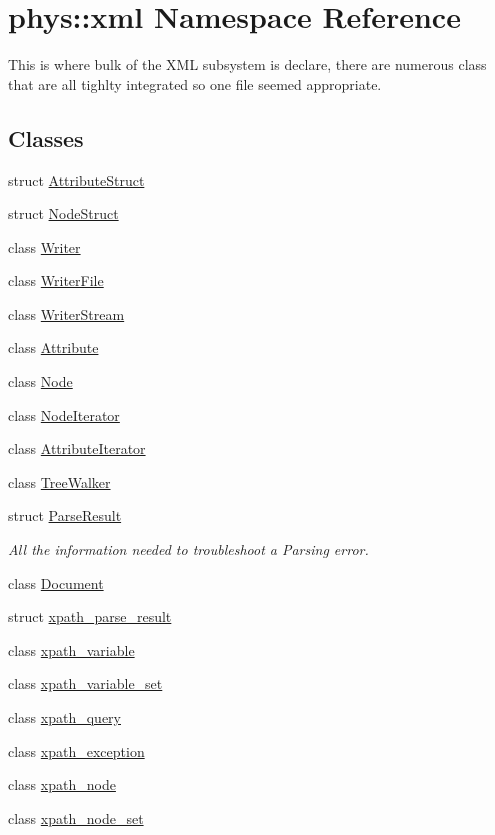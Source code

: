 \hypertarget{namespacephys_1_1xml}{
\section{phys::xml Namespace Reference}
\label{d9/d27/namespacephys_1_1xml}
}


This is where bulk of the XML subsystem is declare, there are numerous class that are all tighlty integrated so one file seemed appropriate.  


\subsection*{Classes}
\begin{DoxyCompactItemize}
\item 
struct \hyperlink{structphys_1_1xml_1_1AttributeStruct}{AttributeStruct}
\item 
struct \hyperlink{structphys_1_1xml_1_1NodeStruct}{NodeStruct}
\item 
class \hyperlink{classphys_1_1xml_1_1Writer}{Writer}
\item 
class \hyperlink{classphys_1_1xml_1_1WriterFile}{WriterFile}
\item 
class \hyperlink{classphys_1_1xml_1_1WriterStream}{WriterStream}
\item 
class \hyperlink{classphys_1_1xml_1_1Attribute}{Attribute}
\item 
class \hyperlink{classphys_1_1xml_1_1Node}{Node}
\item 
class \hyperlink{classphys_1_1xml_1_1NodeIterator}{NodeIterator}
\item 
class \hyperlink{classphys_1_1xml_1_1AttributeIterator}{AttributeIterator}
\item 
class \hyperlink{classphys_1_1xml_1_1TreeWalker}{TreeWalker}
\item 
struct \hyperlink{structphys_1_1xml_1_1ParseResult}{ParseResult}
\begin{DoxyCompactList}\small\item\em All the information needed to troubleshoot a Parsing error. \item\end{DoxyCompactList}\item 
class \hyperlink{classphys_1_1xml_1_1Document}{Document}
\item 
struct \hyperlink{structphys_1_1xml_1_1xpath__parse__result}{xpath\_\-parse\_\-result}
\item 
class \hyperlink{classphys_1_1xml_1_1xpath__variable}{xpath\_\-variable}
\item 
class \hyperlink{classphys_1_1xml_1_1xpath__variable__set}{xpath\_\-variable\_\-set}
\item 
class \hyperlink{classphys_1_1xml_1_1xpath__query}{xpath\_\-query}
\item 
class \hyperlink{classphys_1_1xml_1_1xpath__exception}{xpath\_\-exception}
\item 
class \hyperlink{classphys_1_1xml_1_1xpath__node}{xpath\_\-node}
\item 
class \hyperlink{classphys_1_1xml_1_1xpath__node__set}{xpath\_\-node\_\-set}
\end{DoxyCompactItemize}

